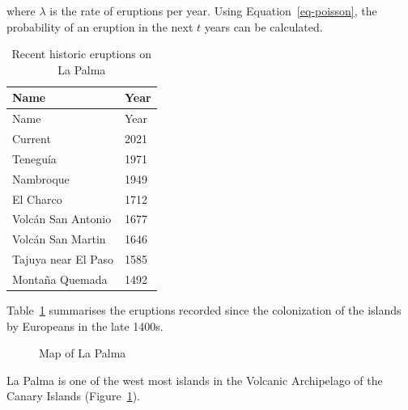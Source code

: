 \documentclass[
]{agujournal2019}
\begin{document}
where \(\lambda\) is the rate of eruptions per year. Using
Equation~\ref{eq-poisson}, the probability of an eruption in the next
\(t\) years can be calculated.

\begin{longtable}[]{@{}ll@{}}
\caption{Recent historic eruptions on La
Palma}\label{tbl-history}\tabularnewline
\toprule\noalign{}
Name & Year \\
\midrule\noalign{}
\endfirsthead
\toprule\noalign{}
Name & Year \\
\midrule\noalign{}
\endhead
\bottomrule\noalign{}
\endlastfoot
Current & 2021 \\
Teneguía & 1971 \\
Nambroque & 1949 \\
El Charco & 1712 \\
Volcán San Antonio & 1677 \\
Volcán San Martin & 1646 \\
Tajuya near El Paso & 1585 \\
Montaña Quemada & 1492 \\
\end{longtable}

Table~\ref{tbl-history} summarises the eruptions recorded since the
colonization of the islands by Europeans in the late 1400s.

\begin{figure}


\caption{\label{fig-map}Map of La Palma}

\end{figure}%

La Palma is one of the west most islands in the Volcanic Archipelago of
the Canary Islands (Figure~\ref{fig-map}).
\end{document}
